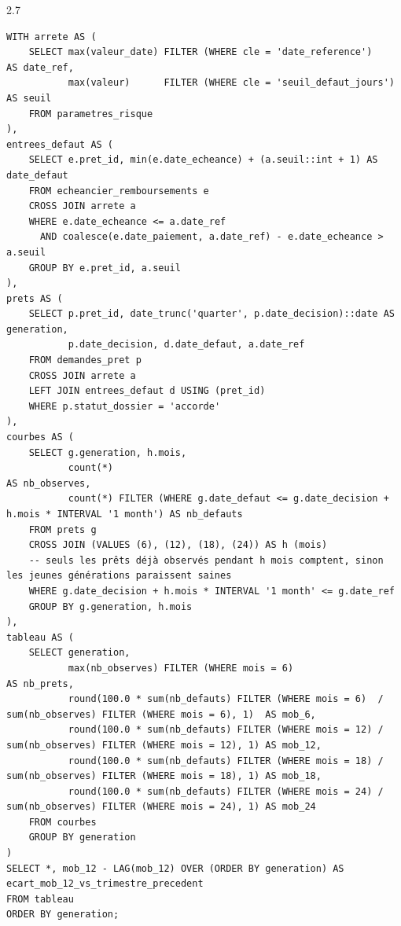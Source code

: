 \begin{correction}{2.7}
\begin{lstlisting}[style=long]
WITH arrete AS (
    SELECT max(valeur_date) FILTER (WHERE cle = 'date_reference')     AS date_ref,
           max(valeur)      FILTER (WHERE cle = 'seuil_defaut_jours') AS seuil
    FROM parametres_risque
),
entrees_defaut AS (
    SELECT e.pret_id, min(e.date_echeance) + (a.seuil::int + 1) AS date_defaut
    FROM echeancier_remboursements e
    CROSS JOIN arrete a
    WHERE e.date_echeance <= a.date_ref
      AND coalesce(e.date_paiement, a.date_ref) - e.date_echeance > a.seuil
    GROUP BY e.pret_id, a.seuil
),
prets AS (
    SELECT p.pret_id, date_trunc('quarter', p.date_decision)::date AS generation,
           p.date_decision, d.date_defaut, a.date_ref
    FROM demandes_pret p
    CROSS JOIN arrete a
    LEFT JOIN entrees_defaut d USING (pret_id)
    WHERE p.statut_dossier = 'accorde'
),
courbes AS (
    SELECT g.generation, h.mois,
           count(*)                                                                    AS nb_observes,
           count(*) FILTER (WHERE g.date_defaut <= g.date_decision + h.mois * INTERVAL '1 month') AS nb_defauts
    FROM prets g
    CROSS JOIN (VALUES (6), (12), (18), (24)) AS h (mois)
    -- seuls les prêts déjà observés pendant h mois comptent, sinon les jeunes générations paraissent saines
    WHERE g.date_decision + h.mois * INTERVAL '1 month' <= g.date_ref
    GROUP BY g.generation, h.mois
),
tableau AS (
    SELECT generation,
           max(nb_observes) FILTER (WHERE mois = 6)                                   AS nb_prets,
           round(100.0 * sum(nb_defauts) FILTER (WHERE mois = 6)  / sum(nb_observes) FILTER (WHERE mois = 6), 1)  AS mob_6,
           round(100.0 * sum(nb_defauts) FILTER (WHERE mois = 12) / sum(nb_observes) FILTER (WHERE mois = 12), 1) AS mob_12,
           round(100.0 * sum(nb_defauts) FILTER (WHERE mois = 18) / sum(nb_observes) FILTER (WHERE mois = 18), 1) AS mob_18,
           round(100.0 * sum(nb_defauts) FILTER (WHERE mois = 24) / sum(nb_observes) FILTER (WHERE mois = 24), 1) AS mob_24
    FROM courbes
    GROUP BY generation
)
SELECT *, mob_12 - LAG(mob_12) OVER (ORDER BY generation) AS ecart_mob_12_vs_trimestre_precedent
FROM tableau
ORDER BY generation;
\end{lstlisting}


\end{correction}
